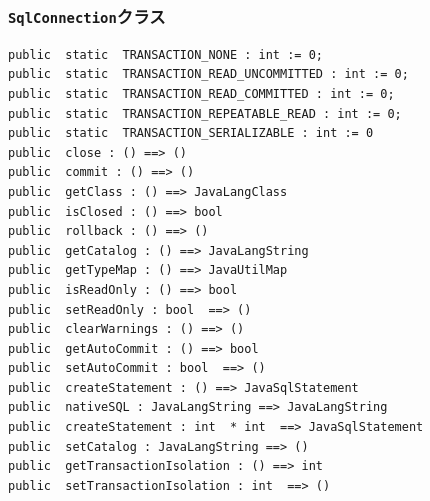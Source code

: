 \documentclass[\pformat,12pt]{jarticle}
\begin{document}
\subsubsection{\texttt{SqlConnection}クラス}
\begin{small}
\begin{verbatim}
public  static  TRANSACTION_NONE : int := 0;
public  static  TRANSACTION_READ_UNCOMMITTED : int := 0;
public  static  TRANSACTION_READ_COMMITTED : int := 0;
public  static  TRANSACTION_REPEATABLE_READ : int := 0;
public  static  TRANSACTION_SERIALIZABLE : int := 0
public  close : () ==> ()
public  commit : () ==> ()
public  getClass : () ==> JavaLangClass
public  isClosed : () ==> bool
public  rollback : () ==> ()
public  getCatalog : () ==> JavaLangString
public  getTypeMap : () ==> JavaUtilMap
public  isReadOnly : () ==> bool
public  setReadOnly : bool  ==> ()
public  clearWarnings : () ==> ()
public  getAutoCommit : () ==> bool
public  setAutoCommit : bool  ==> ()
public  createStatement : () ==> JavaSqlStatement
public  nativeSQL : JavaLangString ==> JavaLangString
public  createStatement : int  * int  ==> JavaSqlStatement
public  setCatalog : JavaLangString ==> ()
public  getTransactionIsolation : () ==> int
public  setTransactionIsolation : int  ==> ()
\end{verbatim}
\end{small}
\end{document}

